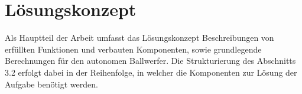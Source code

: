 \section{Lösungskonzept}
Als Hauptteil der Arbeit umfasst das Lösungskonzept Beschreibungen von erfüllten Funktionen und verbauten Komponenten, sowie 
grundlegende Berechnungen für den autonomen Ballwerfer. Die Strukturierung des Abschnitts 3.2 erfolgt dabei in der Reihenfolge, in welcher die Komponenten zur Lösung der Aufgabe benötigt werden.